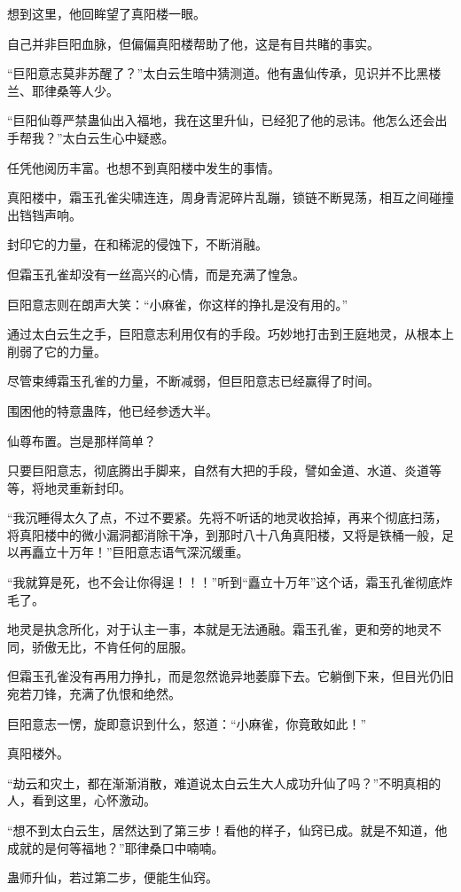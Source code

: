 \begin{this_body}
想到这里，他回眸望了真阳楼一眼。

自己并非巨阳血脉，但偏偏真阳楼帮助了他，这是有目共睹的事实。

“巨阳意志莫非苏醒了？”太白云生暗中猜测道。他有蛊仙传承，见识并不比黑楼兰、耶律桑等人少。

“巨阳仙尊严禁蛊仙出入福地，我在这里升仙，已经犯了他的忌讳。他怎么还会出手帮我？”太白云生心中疑惑。

任凭他阅历丰富。也想不到真阳楼中发生的事情。

真阳楼中，霜玉孔雀尖啸连连，周身青泥碎片乱蹦，锁链不断晃荡，相互之间碰撞出铛铛声响。

封印它的力量，在和稀泥的侵蚀下，不断消融。

但霜玉孔雀却没有一丝高兴的心情，而是充满了惶急。

巨阳意志则在朗声大笑：“小麻雀，你这样的挣扎是没有用的。”

通过太白云生之手，巨阳意志利用仅有的手段。巧妙地打击到王庭地灵，从根本上削弱了它的力量。

尽管束缚霜玉孔雀的力量，不断减弱，但巨阳意志已经赢得了时间。

围困他的特意蛊阵，他已经参透大半。

仙尊布置。岂是那样简单？

只要巨阳意志，彻底腾出手脚来，自然有大把的手段，譬如金道、水道、炎道等等，将地灵重新封印。

“我沉睡得太久了点，不过不要紧。先将不听话的地灵收拾掉，再来个彻底扫荡，将真阳楼中的微小漏洞都消除干净，到那时八十八角真阳楼，又将是铁桶一般，足以再矗立十万年！”巨阳意志语气深沉缓重。

“我就算是死，也不会让你得逞！！！”听到“矗立十万年”这个话，霜玉孔雀彻底炸毛了。

地灵是执念所化，对于认主一事，本就是无法通融。霜玉孔雀，更和旁的地灵不同，骄傲无比，不肯任何的屈服。

但霜玉孔雀没有再用力挣扎，而是忽然诡异地萎靡下去。它躺倒下来，但目光仍旧宛若刀锋，充满了仇恨和绝然。

巨阳意志一愣，旋即意识到什么，怒道：“小麻雀，你竟敢如此！”

真阳楼外。

“劫云和灾土，都在渐渐消散，难道说太白云生大人成功升仙了吗？”不明真相的人，看到这里，心怀激动。

“想不到太白云生，居然达到了第三步！看他的样子，仙窍已成。就是不知道，他成就的是何等福地？”耶律桑口中喃喃。

蛊师升仙，若过第二步，便能生仙窍。


\end{this_body}
